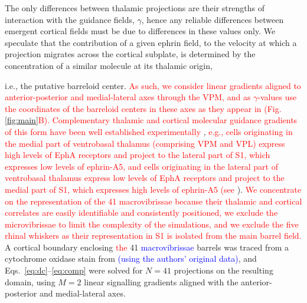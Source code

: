 \documentclass[9pt,lineno,draft]{elife}
\newcommand{\cmnt}[1]{\textcolor{blue}{#1}}
\newcommand{\stu}[1]{\textcolor{red}{#1}}
\begin{document}
The only differences between thalamic projections are their strengths of
interaction with the guidance fields, $\gamma$, hence any reliable differences
between emergent cortical fields must be due to differences in these values
only. We speculate that the contribution of a given ephrin field, to the
velocity at which a projection migrates across the cortical subplate, is
determined by the concentration of a similar molecule at its thalamic origin,

i.e., the putative barreloid center. \stu{As such, we consider linear gradients aligned to anterior-posterior and medial-lateral axes through the VPM, and as $\gamma$-values use the coordinates of the barreloid centers in these axes as they appear in \citep{haidarliu_size_2001} (Fig.\,\ref{fig:main}B).} \stu{Complementary thalamic and cortical molecular guidance gradients of this form have been well established experimentally} \citep{vanderhaeghen_mapping_2000,miller_epha7-ephrin-a5_2006}, \stu{e.g., cells originating in the medial part of ventrobasal thalamus (comprising VPM and VPL) express high levels of EphA receptors and project to the lateral part of S1, which expresses low levels of ephrin-A5, and cells originating in the lateral part of ventrobasal thalamus express low levels of EphA receptors and project to the medial part of S1, which expresses high levels of ephrin-A5 (see} \citealp{gao_regulation_1998,dufour_area_2003,vanderhaeghen_developmental_2004,speer_grading_2005}). \stu{We concentrate on the representation of the 41 macrovibrissae because their thalamic and cortical correlates are easily identifiable and consistently positioned, we exclude the microvibrissae to limit the complexity of the simulations, and we exclude the five rhinal whiskers as their representation in S1 is isolated from the main barrel field.} A cortical boundary enclosing \stu{the} 41 \cmnt{macrovibrissae} barrels was traced from
a cytochrome oxidase stain from \cite{zheng_signal_2001} \cmnt{(using the
  authors' original data)}, and Eqs.~\ref{eq:dc}--\ref{eq:comp} were solved
for $N=41$ projections on the resulting domain, using $M=2$ linear signalling
gradients aligned with the anterior-posterior and medial-lateral axes. 


\end{document}
